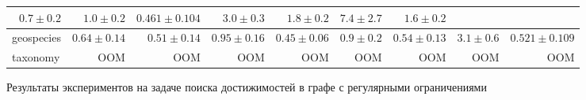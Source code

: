 \begin{frame}
\begin{figure}[H]
\begin{table}[]
{\begin{tabular}{|l|rrrrrrrr|}
  \multicolumn{1}{r|}{$0.7 \pm 0.2$} &
  \multicolumn{1}{r|}{$1.0 \pm 0.2$} &
  \multicolumn{1}{r|}{$0.461 \pm 0.104$} &
  \multicolumn{1}{r|}{$3.0 \pm 0.3$} &
  \multicolumn{1}{r|}{$1.8 \pm 0.2$} &
  \multicolumn{1}{r|}{$7.4 \pm 2.7$} &
  $1.6 \pm 0.2$ \\ \hline
geospecies &
  \multicolumn{1}{r|}{$0.64 \pm 0.14$} &
  \multicolumn{1}{r|}{$0.51 \pm 0.14$} &
  \multicolumn{1}{r|}{$0.95 \pm 0.16$} &
  \multicolumn{1}{r|}{$0.45 \pm 0.06$} &
  \multicolumn{1}{r|}{$0.9 \pm 0.2$} &
  \multicolumn{1}{r|}{$0.54 \pm 0.13$} &
  \multicolumn{1}{r|}{$3.1 \pm 0.6$} &
  $0.521 \pm 0.109$ \\ \hline
taxonomy &
  \multicolumn{1}{r|}{OOM} &
  \multicolumn{1}{r|}{OOM} &
  \multicolumn{1}{r|}{OOM} &
  \multicolumn{1}{r|}{OOM} &
  \multicolumn{1}{r|}{OOM} &
  \multicolumn{1}{r|}{OOM} &
  \multicolumn{1}{r|}{OOM} &
  OOM \\ \hline
\end{tabular}%
}
\label{tab:rdf_regs}
\end{table}
\caption{Результаты экспериментов на задаче поиска достижимостей в графе с регулярными ограничениями}
\end{figure}
\end{frame}

